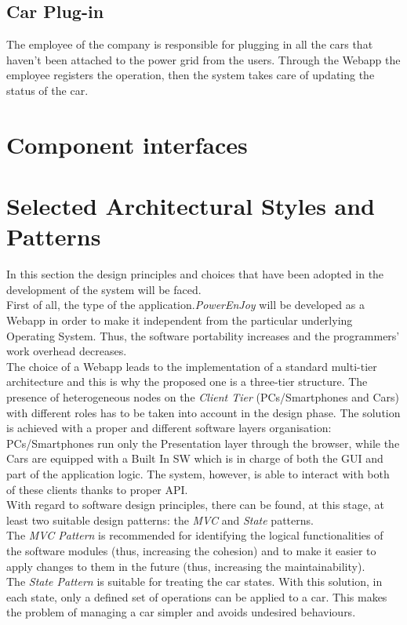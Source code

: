 \documentclass[11pt,a4paper]{report}
\begin{document}
\subsection{Car Plug-in}
The employee of the company is responsible for plugging in all the cars that haven't been attached to the power grid from the users. Through the Webapp the employee registers the operation, then the system takes care of updating the status of the car.
\section{Component interfaces}
\section{Selected Architectural Styles and Patterns}
In this section the design principles and choices that have been adopted in the development of the system will be faced.\\First of all, the type of the application.\textit{PowerEnJoy} will be developed as a Webapp in order to make it independent from the particular underlying Operating System. Thus, the software portability increases and the programmers' work overhead decreases.\\The choice of a Webapp leads to the implementation of a standard multi-tier architecture and this is why the proposed one is a three-tier structure. The presence of heterogeneous nodes on the \textit{Client Tier} (PCs/Smartphones and Cars) with different roles  has to be taken into account in the design phase. The solution is achieved with a proper and different software layers organisation: PCs/Smartphones run only the Presentation layer through the browser, while the Cars are equipped with a Built In SW which is in charge of both the GUI and part of the application logic. The system, however, is able to interact with both of these clients thanks to proper API.\\With regard to software design principles, there can be found, at this stage, at least two suitable design patterns: the \textit{MVC} and \textit{State} patterns.\\The \textit{MVC Pattern} is recommended for identifying the logical functionalities of the software modules (thus, increasing the cohesion) and to make it easier to apply changes to them in the future (thus, increasing the maintainability).\\The \textit{State Pattern} is suitable for treating the car states. With this solution, in each state, only a defined set of operations can be applied to a car. This makes the problem of managing a car simpler and avoids undesired behaviours.
\end{document}
